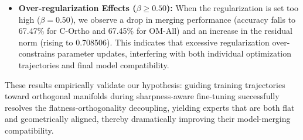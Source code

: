 \documentclass{article}
\theoremstyle{plain}
\theoremstyle{definition}
\theoremstyle{remark}
\begin{document}
\begin{itemize}
    \item \textbf{Over-regularization Effects ($\beta \ge 0.50$):} When the regularization is set too high ($\beta=0.50$), we observe a drop in merging performance (accuracy falls to 67.47\% for C-Ortho and 67.45\% for OM-All) and an increase in the residual norm (rising to 0.708506). This indicates that excessive regularization over-constrains parameter updates, interfering with both individual optimization trajectories and final model compatibility.
\end{itemize}

These results empirically validate our hypothesis: guiding training trajectories toward orthogonal manifolds during sharpness-aware fine-tuning successfully resolves the flatness-orthogonality decoupling, yielding experts that are both flat and geometrically aligned, thereby dramatically improving their model-merging compatibility.
\end{document}
